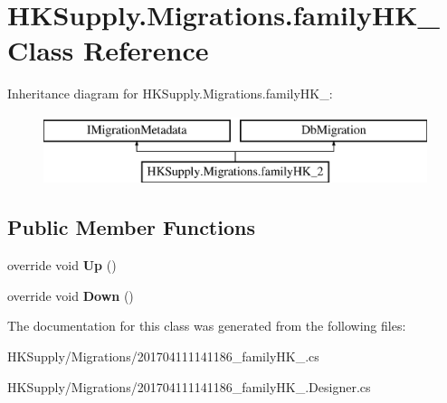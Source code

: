 \hypertarget{class_h_k_supply_1_1_migrations_1_1family_h_k__2}{}\section{H\+K\+Supply.\+Migrations.\+family\+H\+K\+\_ Class Reference}
\label{class_h_k_supply_1_1_migrations_1_1family_h_k__2}
Inheritance diagram for H\+K\+Supply.\+Migrations.\+family\+H\+K\+\_\+:\begin{figure}[H]
\begin{center}
\leavevmode
\includegraphics[height=2.000000cm]{class_h_k_supply_1_1_migrations_1_1family_h_k__2}
\end{center}
\end{figure}
\subsection*{Public Member Functions}
\begin{DoxyCompactItemize}
\item 
\mbox{\label{class_h_k_supply_1_1_migrations_1_1family_h_k__2_a242fb2dd8239f14af58bd98e5cba22a3}} 
override void {\bfseries Up} ()
\item 
\mbox{\label{class_h_k_supply_1_1_migrations_1_1family_h_k__2_a57a40dfe045d0083ca3d277cf8e180ef}} 
override void {\bfseries Down} ()
\end{DoxyCompactItemize}


The documentation for this class was generated from the following files\+:\begin{DoxyCompactItemize}
\item 
H\+K\+Supply/\+Migrations/201704111141186\+\_\+family\+H\+K\+\_.\+cs\item 
H\+K\+Supply/\+Migrations/201704111141186\+\_\+family\+H\+K\+\_.\+Designer.\+cs\end{DoxyCompactItemize}
